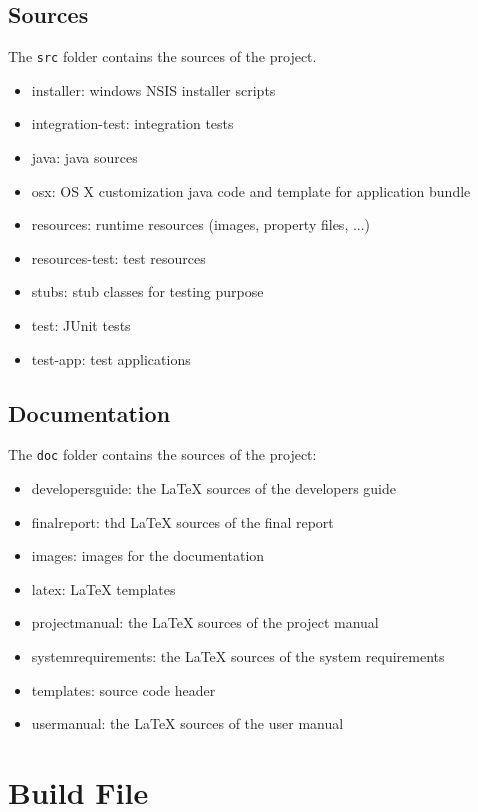 \documentclass[11pt,a4paper]{article}
\begin{document}
\subsection{Sources}
The \texttt{src} folder contains the sources of the project.

\begin{itemize}
 \item installer: windows NSIS installer scripts
 \item integration-test: integration tests
 \item java: java sources
 \item osx: OS X customization java code and template for application bundle
 \item resources: runtime resources (images, property files, ...)
 \item resources-test: test resources
 \item stubs: stub classes for testing purpose
 \item test: JUnit tests
 \item test-app: test applications
\end{itemize}

\subsection{Documentation}
The \texttt{doc} folder contains the sources of the project:

\begin{itemize}
 \item developersguide: the \LaTeX{} sources of the developers guide
 \item finalreport: thd \LaTeX{} sources of the final report
 \item images: images for the documentation
 \item latex: \LaTeX{} templates
 \item projectmanual: the \LaTeX{} sources of the project manual
 \item systemrequirements: the \LaTeX{} sources of the system requirements
 \item templates: source code header
 \item usermanual: the \LaTeX{} sources of the user manual
\end{itemize}


\section{Build File}
\end{document}
